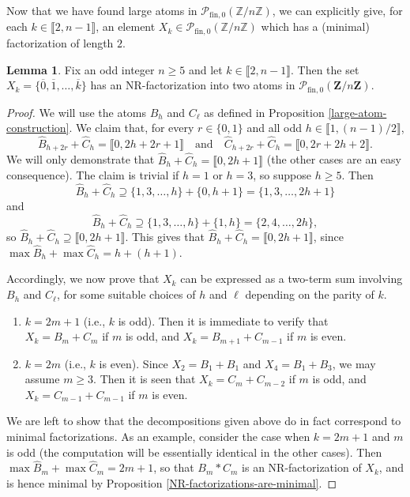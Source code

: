\documentclass{report}
\renewcommand{\P}{\mathcal{P}}
\newcommand{\ZZ}{\mathbb{Z}}
\newcommand{\llb}{\llbracket}
\newcommand{\rrb}{\rrbracket}
\newcommand{\fin}{\textrm{fin}}
\renewcommand{\:}{\text{:}}
\theoremstyle{definition}
\newtheorem{lemma}[defn]{Lemma}
\begin{document}
Now that we have found large atoms in $\P_{\fin,0}(\ZZ/n\ZZ)$, we can explicitly give, for each $k\in \llb 2,n-1\rrb$, an element $X_k\in \P_{\fin,0}(\ZZ/n\ZZ)$ which has a (minimal) factorization of length $2$.

\begin{lemma}\label{2-atom-factorization}
	Fix an odd integer $n\ge 5$ and let $k\in \llb 2, n-1 \rrb$.
	Then the set $X_k = \{\overline{0},\overline{1},\dots, \overline{k}\}$ has an \textup{NR}-factorization into two atoms in $\P_{\fin,0}(\mathbf{Z}/n\mathbf{Z})$.
\end{lemma}

\begin{proof}
	We will use the atoms $B_h$ and $C_\ell$ as defined in Proposition \ref{large-atom-construction}. We claim that, for every $r\in\{0,1\}$ and all odd $h\in \llb 1, (n-1)/2 \rrb$,
	\[
	\hat{B}_{h+2r}+\hat{C}_h = \llb 0, 2h+2r+1 \rrb
	\quad\text{and}\quad
	\hat{C}_{h+2r} + \hat{C}_{h} = \llb 0, 2r+2h+2\rrb.
	\]
	We will only demonstrate that $\hat{B}_h + \hat{C}_h = \llb 0, 2h+1 \rrb$ (the other cases are an easy consequence).
	The claim is trivial if $h=1$ or $h=3$, so suppose $h \ge 5$.
	Then
	\[
	\hat{B}_h + \hat{C}_h \supseteq \{1,3,\dots,h\} + \{0, h+1\} = \{1,3,\dots, 2h+1\}
	\]
	and
	\[
	\hat{B}_h + \hat{C}_h \supseteq \{1,3,\dots,h\} + \{1, h\} = \{2,4,\dots, 2h\},
	\]
	so $\hat{B}_h +\hat{C}_h \supseteq \llb 0 , 2h+1 \rrb$.
	This gives that $\hat{B}_h +\hat{C}_h = \llb 0 , 2h+1 \rrb$, since $\max\hat{B}_h+\max\hat{C}_h = h+(h+1)$.
	
	Accordingly, we now prove that $X_k$ can be expressed as a two-term sum involving $B_h$ and $C_\ell$, for some suitable choices of $h$ and $\ell$ depending on the parity of $k$.
	\begin{enumerate}[leftmargin=1.8cm,label={\textsc{Case }\arabic{*}:}]
		\item $k = 2m+1$ (i.e., $k$ is odd). Then it is immediate to verify that $X_k = B_m+C_m$ if $m$ is odd, and $X_k = B_{m+1} +C_{m-1}$ if $m$ is even.
		\item $k = 2m$ (i.e., $k$ is even). Since $X_2 = B_1+B_1$ and $X_4 = B_1+B_3$, we may assume $m\ge3$. Then it is seen that $X_k = C_{m} + C_{m-2}$ if $m$ is odd, and $X_k = C_{m-1}+C_{m-1}$ if $m$ is even.
	\end{enumerate}
	We are left to show that the decompositions given above do in fact correspond to minimal factorizations. As an example, consider the case when $k=2m+1$ and $m$ is odd (the computation will be essentially identical in the other cases).
	Then $\max\hat{B}_{m}+\max\hat{C}_m = 2m+1$, so that $B_m \ast C_m$ is an NR-factorization of $X_k$, and is hence minimal by Proposition \ref{NR-factorizations-are-minimal}.
\end{proof}
\end{document}
